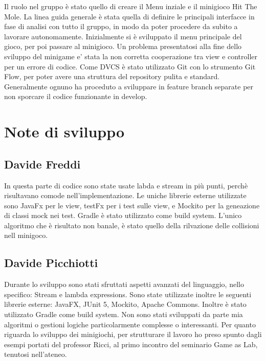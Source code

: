 \documentclass[a4paper,12pt]{report}
\begin{document}
Il ruolo nel gruppo è stato quello di creare il Menu inziale e il minigioco Hit The Mole.
    La linea guida generale è stata quella di definire le principali interfacce in fase di analisi con tutto il gruppo, in modo da poter procedere da subito a lavorare autonomamente.
    Inizialmente si è sviluppato il menu principale del gioco, per poi passare al minigioco.
	Un problema presentatosi alla fine dello sviluppo del minigame e' stata la non corretta cooperazione tra view e controller per un errore di codice.
    Come DVCS è stato utilizzato Git con lo strumento Git Flow, per poter avere una struttura del repository pulita e standard.
    Generalmente ognuno ha proceduto a sviluppare in feature branch separate per non sporcare il codice funzionante in develop.

	\section{Note di sviluppo}

	\subsection{Davide Freddi}

	In questa parte di codice sono state usate labda e stream in più punti, perchè risultavano comode nell'implementazione.
    Le uniche librerie esterne utilizzate sono JavaFx per le view, testFx per i test sulle view, e Mockito per la geneazione di classi mock nei test.
    Gradle è stato utilizzato come build system.
    L'unico algoritmo che è risultato non banale, è stato quello della rilvazione delle collisioni nell minigoco.

	\subsection{Davide Picchiotti}

    Durante lo sviluppo sono stati sfruttati aspetti avanzati del linguaggio, nello specifico: Stream e lambda expressions.\newline
    Sono state utilizzate inoltre le seguenti librerie esterne: JavaFX, JUnit 5, Mockito, Apache Commons.\newline
    Inoltre è stato utilizzato Gradle come build system.\newline
    Non sono stati sviluppati da parte mia algoritmi o gestioni logiche particolarmente complesse o interessanti.\newline
    Per quanto riguarda lo sviluppo dei minigiochi, per strutturare il lavoro ho preso spunto dagli esempi portati del professor Ricci,
    al primo incontro del seminario Game as Lab, tenutosi nell'ateneo.\newline
\end{document}
